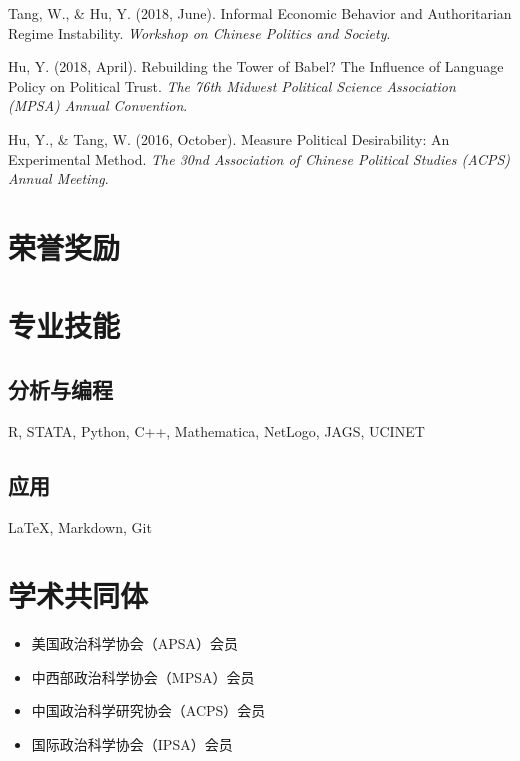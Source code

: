 \documentclass[11pt, a4paper]{awesome-cv}
\providecommand{\tightlist}{%
	\setlength{\itemsep}{0pt}\setlength{\parskip}{0pt}}
\begin{document}
\leavevmode\hypertarget{ref-TangHu2018}{}%
Tang, W., \& Hu, Y. (2018, June). Informal {Economic Behavior} and
{Authoritarian Regime Instability}. \emph{Workshop on {Chinese Politics}
and {Society}}.

\leavevmode\hypertarget{ref-Hu2018a}{}%
Hu, Y. (2018, April). Rebuilding the {Tower} of {Babel}? {The Influence}
of {Language Policy} on {Political Trust}. \emph{The 76th {Midwest
Political Science Association} ({MPSA}) {Annual Convention}}.

\leavevmode\hypertarget{ref-HuTang2016a}{}%
Hu, Y., \& Tang, W. (2016, October). Measure {Political Desirability}:
{An Experimental Method}. \emph{The 30nd {Association} of {Chinese
Political Studies} ({ACPS}) {Annual Meeting}}.

\endgroup

\hypertarget{ux8363ux8a89ux5956ux52b1}{%
\section{荣誉奖励}\label{ux8363ux8a89ux5956ux52b1}}

\begin{cventries}
    \vspace{-4.0mm}
    \vspace{-4.0mm}
    \vspace{-4.0mm}
\end{cventries}

\hypertarget{ux4e13ux4e1aux6280ux80fd}{%
\section{专业技能}\label{ux4e13ux4e1aux6280ux80fd}}

\hypertarget{ux5206ux6790ux4e0eux7f16ux7a0b}{%
\subsection{\texorpdfstring{\textbf{分析与编程}}{分析与编程}}\label{ux5206ux6790ux4e0eux7f16ux7a0b}}

R, STATA, Python, C++, Mathematica, NetLogo, JAGS, UCINET

\hypertarget{ux5e94ux7528}{%
\subsection{\texorpdfstring{\textbf{应用}}{应用}}\label{ux5e94ux7528}}

LaTeX, Markdown, Git

\hypertarget{ux5b66ux672fux5171ux540cux4f53}{%
\section{学术共同体}\label{ux5b66ux672fux5171ux540cux4f53}}

\begin{itemize}
\tightlist
\item
  美国政治科学协会（APSA）会员
\item
  中西部政治科学协会（MPSA）会员
\item
  中国政治科学研究协会（ACPS）会员
\item
  国际政治科学协会（IPSA）会员
\end{itemize}
\end{document}
